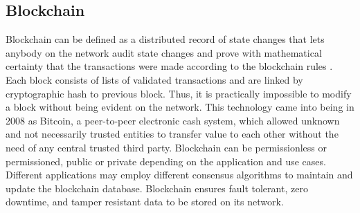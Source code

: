\subsection{Blockchain}
Blockchain can be defined as a distributed 
record of state changes that lets 
anybody on the network audit state changes and prove with 
mathematical certainty that the transactions were made according 
to the blockchain rules \cite{enoughBitcoinForEthereum}. Each block consists 
of lists of validated transactions and are linked by cryptographic hash 
to previous block. Thus, it is practically impossible to modify a block 
without being evident on the network. This technology came into being 
in 2008 as Bitcoin, a peer-to-peer electronic cash system, 
\cite{Bitcoin_Satoshi} which allowed unknown and not necessarily trusted 
entities to transfer value to each other without the need of any central 
trusted third party. Blockchain can be permissionless or permissioned, public or 
private depending on the application and use cases. Different applications may 
employ different consensus algorithms to maintain and update the blockchain 
database. Blockchain ensures fault tolerant, zero downtime, and tamper resistant 
data to be stored on its network. 
 
